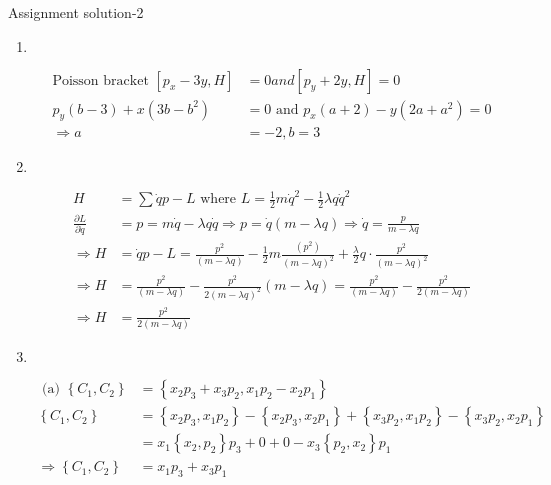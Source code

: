 \begin{abox}
	Assignment solution-2
\end{abox}
\begin{enumerate}
	\item $\left. \right. $
\begin{answer}
	\begin{align*}
	\text{Poisson bracket }\left[p_{x}-3 y, H\right]&=0 and \left[p_{y}+2 y, H\right]=0\\
	p_{y}(b-3)+x\left(3 b-b^{2}\right)&=0\text{ and }p_{x}(a+2)-y\left(2 a+a^{2}\right)=0\\
	\Rightarrow a&=-2, b=3
	\end{align*}
\end{answer} 
	\item $\left. \right. $
	\begin{answer}
		\begin{align*}
		H&=\sum \dot{q} p-L\text{ where }L=\frac{1}{2} m \dot{q}^{2}-\frac{1}{2} \lambda q \dot{q}^{2}\\
		\frac{\partial L}{\partial \dot{q}}&=p=m \dot{q}-\lambda q \dot{q} \Rightarrow p=\dot{q}(m-\lambda q) \Rightarrow \dot{q}=\frac{p}{m-\lambda q}\\
		\Rightarrow H&=\dot{q} p-L=\frac{p^{2}}{(m-\lambda q)}-\frac{1}{2} m \frac{\left(p^{2}\right)}{(m-\lambda q)^{2}}+\frac{\lambda}{2} q \cdot \frac{p^{2}}{(m-\lambda q)^{2}}\\
		\Rightarrow H&=\frac{p^{2}}{(m-\lambda q)}-\frac{p^{2}}{2(m-\lambda q)^{2}}(m-\lambda q)=\frac{p^{2}}{(m-\lambda q)}-\frac{p^{2}}{2(m-\lambda q)}\\
		\Rightarrow H&=\frac{p^{2}}{2(m-\lambda q)}
		\end{align*}
	\end{answer}
	\item $\left. \right. $
	\begin{answer}
		\begin{align*}
	\text{	(a) }\left\{C_{1}, C_{2}\right\}&=\left\{x_{2} p_{3}+x_{3} p_{2}, x_{1} p_{2}-x_{2} p_{1}\right\}\\
		\left\{C_{1}, C_{2}\right\} &=\left\{x_{2} p_{3}, x_{1} p_{2}\right\}-\left\{x_{2} p_{3}, x_{2} p_{1}\right\}+\left\{x_{3} p_{2}, x_{1} p_{2}\right\}-\left\{x_{3} p_{2}, x_{2} p_{1}\right\} \\
		&=x_{1}\left\{x_{2}, p_{2}\right\} p_{3}+0+0-x_{3}\left\{p_{2}, x_{2}\right\} p_{1}\\
		\Rightarrow\left\{C_{1}, C_{2}\right\}&=x_{1} p_{3}+x_{3} p_{1}\\

\end{align*}
\end{answer}
\end{enumerate}
